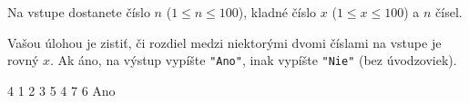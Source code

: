 




Na vstupe dostanete číslo $n$ ($1\leq n \leq 100$), kladné číslo $x$ ($1 \leq x \leq 100$) a $n$
čísel. 

Vašou úlohou je zistiť, či rozdiel medzi niektorými dvomi číslami na vstupe je rovný $x$. Ak
áno, na výstup vypíšte \texttt{"Ano"}, inak vypíšte \texttt{"Nie"} (bez úvodzoviek). 

 4
1 2 3 5 4 7 6
\vystup
Ano
\koniec


